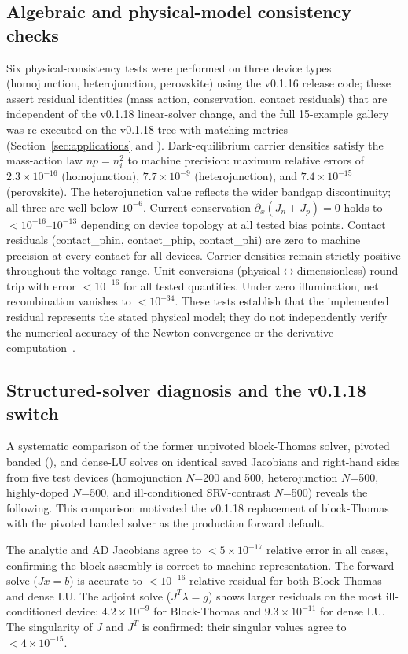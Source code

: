 \subsection{Algebraic and physical-model consistency checks}
Six physical-consistency tests were performed on three device types
(homojunction, heterojunction, perovskite) using the v0.1.16 release
code; these assert residual identities (mass action, conservation,
contact residuals) that are independent of the v0.1.18 linear-solver
change, and the full 15-example gallery was re-executed on the v0.1.18
tree with matching metrics (Section~\ref{sec:applications} and
). Dark-equilibrium carrier densities satisfy the mass-action law
$np=n_i^2$ to machine precision: maximum relative errors of
$2.3\times10^{-16}$ (homojunction), $7.7\times10^{-9}$
(heterojunction), and $7.4\times10^{-15}$ (perovskite). The
heterojunction value reflects the wider bandgap discontinuity; all
three are well below $10^{-6}$.
Current conservation $\partial_x(J_n+J_p)=0$ holds to
$<10^{-16}$--$10^{-13}$ depending on device topology at all tested bias points. Contact residuals
(contact\_phin, contact\_phip, contact\_phi) are zero to machine
precision at every contact for all devices. Carrier densities remain
strictly positive throughout the voltage range. Unit conversions
(physical$\leftrightarrow$dimensionless) round-trip with error $<10^{-16}$
for all tested quantities. Under zero illumination, net
recombination vanishes to $<10^{-34}$. These tests establish that the
implemented residual represents the stated physical model; they do not
independently verify the numerical accuracy of the Newton convergence
or the derivative computation~\cite{kerkhoven1988}.

\subsection{Structured-solver diagnosis and the v0.1.18 switch}\label{sec:conditioning}
A systematic comparison of the former unpivoted block-Thomas solver,
pivoted banded (), and dense-LU solves on identical
saved Jacobians and right-hand sides from five test devices (homojunction
$N$=200 and 500, heterojunction $N$=500, highly-doped $N$=500, and
ill-conditioned SRV-contrast $N$=500) reveals the following. This
comparison motivated the v0.1.18 replacement of block-Thomas with the
pivoted banded solver as the production forward default.

The analytic and AD Jacobians agree to $<5\times10^{-17}$ relative error
in all cases, confirming the block assembly is correct to machine representation. The forward
solve ($Jx=b$) is accurate to $<10^{-16}$ relative residual for both
Block-Thomas and dense LU. The adjoint solve ($J^T\lambda=g$) shows larger
residuals on the most ill-conditioned device: $4.2\times10^{-9}$ for
Block-Thomas and $9.3\times10^{-11}$ for dense LU. The singularity
of $J$ and $J^T$ is confirmed: their singular values agree to
$<4\times10^{-15}$.

